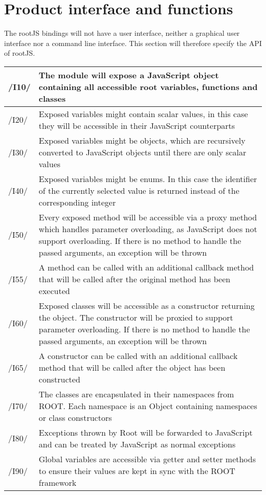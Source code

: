 \chapter{Product interface and functions}
The rootJS bindings will not have a user interface, neither a graphical user interface nor a command line interface.
This section will therefore specify the API of rootJS.


\begin{longtable}{|p{1cm} | p{15cm}|}
  \hline
  /I10/ & The module will expose a JavaScript object containing all accessible root variables, functions and classes \\
  \hline
  /I20/ & Exposed variables might contain scalar values, in this case they will be accessible in their JavaScript counterparts \\
  \hline
  /I30/ & Exposed variables might be objects, which are recursively converted to JavaScript objects until there are only scalar values \\
  \hline
  /I40/ & Exposed variables might be enums. In this case the identifier of the currently selected value is returned instead of the corresponding integer \\
  \hline
  /I50/ & Every exposed method will be accessible via a proxy method which handles parameter overloading, as JavaScript does not support overloading. If there is no method to handle the passed arguments, an exception will be thrown \\
  \hline
  /I55/ & A method can be called with an additional callback method that will be called after the original method has been executed \\
  \hline
  /I60/ & Exposed classes will be accessible as a constructor returning the object. The constructor will be proxied to support parameter overloading. If there is no method to handle the passed arguments, an exception will be thrown  \\
  \hline
  /I65/ & A constructor can be called with an additional callback method that will be called after the object has been constructed \\
  \hline
  /I70/ & The classes are encapsulated in their namespaces from ROOT. Each namespace is an Object containing namespaces or class constructors \\
  \hline
  /I80/ & Exceptions thrown by Root will be forwarded to JavaScript and can be treated by JavaScript as normal exceptions \\
  \hline
  /I90/ & Global variables are accessible via getter and setter methods to ensure their values are kept in sync with the ROOT framework \\
  \hline
\end{longtable}
